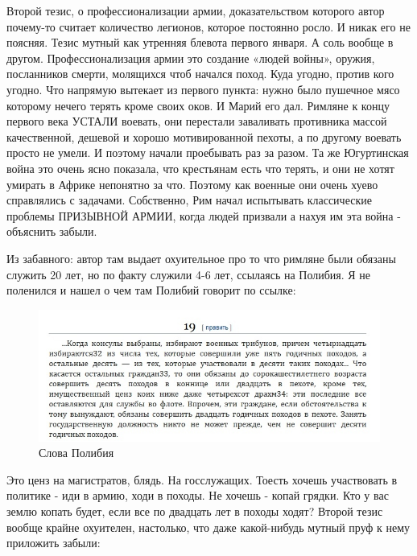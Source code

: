 Второй тезис, о профессионализации армии, доказательством которого автор почему-то считает количество легионов, которое постоянно росло. И никак его не поясняя. Тезис мутный как утренняя блевота первого января. А соль вообще в другом. Профессионализация армии это создание «людей войны», оружия, посланников смерти, молящихся чтоб начался поход. Куда угодно, против кого угодно. Что напрямую вытекает из первого пункта: нужно было пушечное мясо которому нечего терять кроме своих оков. И Марий его дал. Римляне к концу первого века УСТАЛИ воевать, они перестали заваливать противника массой качественной, дешевой и хорошо мотивированной пехоты, а по другому воевать просто не умели. И поэтому начали проебывать раз за разом. Та же Югуртинская война это очень ясно показала, что крестьянам есть что терять, и они не хотят умирать в Африке непонятно за что. Поэтому как военные они очень хуево справлялись с задачами. Собственно, Рим начал испытывать классические проблемы ПРИЗЫВНОЙ АРМИИ, когда людей призвали а нахуя им эта война - объяснить забыли.


Из забавного: автор там выдает охуительное про то что римляне были обязаны служить 20 лет, но по факту служили 4-6 лет, ссылаясь на Полибия. Я не поленился и нашел о чем там Полибий говорит по ссылке:

\begin{figure}[h!tb]
	\centering\includegraphics[scale=0.6]{Mariy/1601698942180418339.png}
	\caption{Слова Полибия}
\end{figure}

Это ценз на магистратов, блядь. На госслужащих. Тоесть хочешь участвовать в политике - иди в армию, ходи в походы. Не хочешь - копай грядки. Кто у вас землю копать будет, если все по двадцать лет в походы ходят? Второй тезис вообще крайне охуителен, настолько, что даже какой-нибудь мутный пруф к нему приложить забыли:

